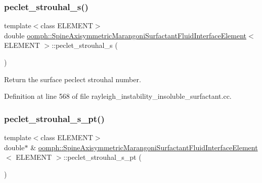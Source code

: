 \subsubsection{\texorpdfstring{peclet\+\_\+strouhal\+\_\+s()}{peclet\_strouhal\_s()}}
{\footnotesize\ttfamily template$<$class E\+L\+E\+M\+E\+NT$>$ \\
double \hyperlink{classoomph_1_1SpineAxisymmetricMarangoniSurfactantFluidInterfaceElement}{oomph\+::\+Spine\+Axisymmetric\+Marangoni\+Surfactant\+Fluid\+Interface\+Element}$<$ E\+L\+E\+M\+E\+NT $>$\+::peclet\+\_\+strouhal\+\_\+s (\begin{DoxyParamCaption}{ }\end{DoxyParamCaption})\hspace{0.3cm}{\ttfamily [inline]}}



Return the surface peclect strouhal number. 



Definition at line 568 of file rayleigh\+\_\+instability\+\_\+insoluble\+\_\+surfactant.\+cc.

\mbox{\label{classoomph_1_1SpineAxisymmetricMarangoniSurfactantFluidInterfaceElement_a943d445ebca59b8c2eeb6584eeba366e}} 
\subsubsection{\texorpdfstring{peclet\+\_\+strouhal\+\_\+s\+\_\+pt()}{peclet\_strouhal\_s\_pt()}}
{\footnotesize\ttfamily template$<$class E\+L\+E\+M\+E\+NT$>$ \\
double$\ast$ \& \hyperlink{classoomph_1_1SpineAxisymmetricMarangoniSurfactantFluidInterfaceElement}{oomph\+::\+Spine\+Axisymmetric\+Marangoni\+Surfactant\+Fluid\+Interface\+Element}$<$ E\+L\+E\+M\+E\+NT $>$\+::peclet\+\_\+strouhal\+\_\+s\+\_\+pt (\begin{DoxyParamCaption}{ }\end{DoxyParamCaption})\hspace{0.3cm}{\ttfamily [inline]}}




